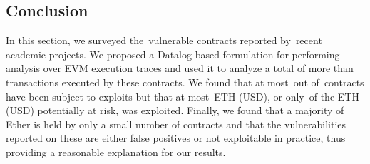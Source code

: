 \subsection{Conclusion}
\label{sec:5a:conclusion}

In this section, we surveyed the~\VulnerableContracts vulnerable contracts reported by~\PapersAnalyzed recent academic projects. We proposed a Datalog-based formulation for performing analysis over EVM execution traces and used it to analyze a total of more than~ transactions executed by these contracts. We found that at most~\NumExploitedContracts out of~\VulnerableContracts contracts have been subject to exploits but that at most~\ExploitedEther ETH (\ExploitedEtherUSD USD), or only~\PercentExploitedEther of the \EtherClaimedVulnerable ETH (\EtherClaimedVulnerableUSD USD) potentially at risk, was exploited.
Finally, we found that a majority of Ether is held by only a small number of contracts and that the vulnerabilities reported on these are either false positives or not exploitable in practice, thus providing a reasonable explanation for our results.

